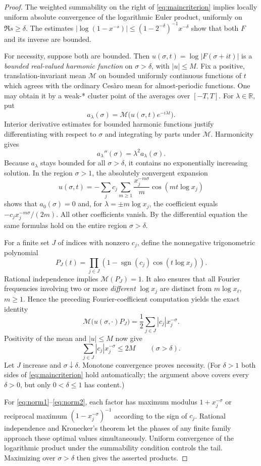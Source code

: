 \documentclass[12pt,letterpaper]{article}
\numberwithin{equation}{section}
\theoremstyle{remark}
\DeclareMathOperator{\sgn}{sgn}
\begin{document}
\begin{proof}
The weighted summability on the right of \eqref{eq:maincriterion} implies locally uniform absolute convergence of the logarithmic Euler product, uniformly on $\Re s\ge\delta$. The estimates $|\log(1-x^{-s})|\le (1-2^{-\delta})^{-1}x^{-\delta}$ show that both $F$ and its inverse are bounded.

For necessity, suppose both are bounded. Then $u(\sigma,t)=\log|F(\sigma+it)|$ is a \emph{bounded real-valued harmonic function} on $\sigma>\delta$, with $|u|\le M$. Fix a positive, translation-invariant mean $\mathcal M$ on bounded uniformly continuous functions of $t$ which agrees with the ordinary Ces\`aro mean for almost-periodic functions. One may obtain it by a weak-* cluster point of the averages over $[-T,T]$. For $\lambda\in\mathbb R$, put
\[
 a_\lambda(\sigma)=\mathcal M\big(u(\sigma,t)e^{-i\lambda t}\big).
\]
Interior derivative estimates for bounded harmonic functions justify differentiating with respect to $\sigma$ and integrating by parts under $\mathcal M$. Harmonicity gives
\[
 a_\lambda''(\sigma)=\lambda^2 a_\lambda(\sigma).
\]
Because $a_\lambda$ stays bounded for all $\sigma>\delta$, it contains no exponentially increasing solution. In the region $\sigma>1$, the absolutely convergent expansion
\[
 u(\sigma,t)=-\sum_j c_j\sum_{m\ge1}\frac{x_j^{-m\sigma}}{m}
 \cos(mt\log x_j)
\]
shows that $a_0(\sigma)=0$ and, for $\lambda=\pm m\log x_j$, the coefficient equals $-c_jx_j^{-m\sigma}/(2m)$. All other coefficients vanish. By the differential equation the same formulas hold on the entire region $\sigma>\delta$.

For a finite set $J$ of indices with nonzero $c_j$, define the nonnegative trigonometric polynomial
\[
 P_J(t)=\prod_{j\in J}\left(1-\sgn(c_j)\cos(t\log x_j)\right).
\]
Rational independence implies $\mathcal M(P_J)=1$. It also ensures that all Fourier frequencies involving two or more \emph{different} $\log x_j$ are distinct from $m\log x_\ell$, $m\ge1$. Hence the preceding Fourier-coefficient computation yields the exact identity
\[
 \mathcal M\big(u(\sigma,\cdot)P_J\big)
 =\frac12\sum_{j\in J}|c_j|x_j^{-\sigma}.
\]
Positivity of the mean and $|u|\le M$ now give
\[
 \sum_{j\in J}|c_j|x_j^{-\sigma}\le2M
 \qquad(\sigma>\delta).
\]
Let $J$ increase and $\sigma\downarrow\delta$. Monotone convergence proves necessity. (For $\delta>1$ both sides of \eqref{eq:maincriterion} hold automatically; the argument above covers every $\delta>0$, but only $0<\delta\le1$ has content.)

For \eqref{eq:norm1}--\eqref{eq:norm2}, each factor has maximum modulus $1+x_j^{-\sigma}$ or reciprocal maximum $(1-x_j^{-\sigma})^{-1}$ according to the sign of $c_j$. Rational independence and Kronecker's theorem let the phases of any finite family approach these optimal values simultaneously. Uniform convergence of the logarithmic product under the summability condition controls the tail. Maximizing over $\sigma>\delta$ then gives the asserted products.
\end{proof}
\end{document}
